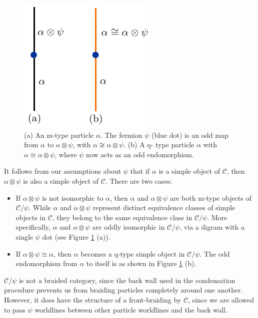 \documentclass[12pt,a4paper]{article}
\newcommand{\tp}{\otimes}
\newcommand{\mcc}{\mathcal{C}}
\newcommand{\ot}{\otimes}
\begin{document}
\medskip

\begin{figure}
\begin{center}
\includegraphics{mvsqtype.pdf}
\caption{ \label{mvsqtype} (a) An m-type particle $\alpha$. The fermion $\psi$ (blue dot) is 
an odd map from $\alpha$ to $\alpha\tp \psi$, with $\alpha\not\cong\alpha\tp\psi$. (b) A q-
type particle $\alpha$ with $\alpha\cong\alpha\tp\psi$, where $\psi$ now acts as an odd 
endomorphism.}
\end{center}
\end{figure} 

It follows from our assumptions about $\psi$ that if $\alpha$ is a simple object of $\mcc$, then
$\alpha\ot\psi$ is also a simple object of $\mcc$.
There are two cases:
\begin{itemize}
	\item If $\alpha\ot\psi$ is not isomorphic to $\alpha$, then $\alpha$ and $\alpha\ot\psi$ are both m-type
	objects of $\mcc/\psi$.
	While $\alpha$ and $\alpha\ot\psi$ represent distinct equivalence classes of simple objects in $\mcc$,
	they belong to the same equivalence class in $\mcc/
	\psi$.
	More specifically, $\alpha$ and $\alpha\ot\psi$ are oddly isomorphic in $\mcc/\psi$, 
	via a digram with a single $\psi$ dot (see Figure \ref{mvsqtype} (a)).
	\item If $\alpha\ot\psi \cong \alpha$, then $\alpha$ becomes a q-type simple object in $\mcc/\psi$.
	The odd endomorphism from $\alpha$ to itself is as shown in Figure \ref{mvsqtype} (b).
\end{itemize}

\medskip

$\mcc/\psi$ is not a braided category, since the back wall used in the condensation procedure 
prevents us from braiding particles completely around one another. 
However, it does have the structure of a front-braiding by $\mcc$, since we are allowed to 
pass $\psi$ worldlines between other particle worldlines and the back wall. 
\end{document}
